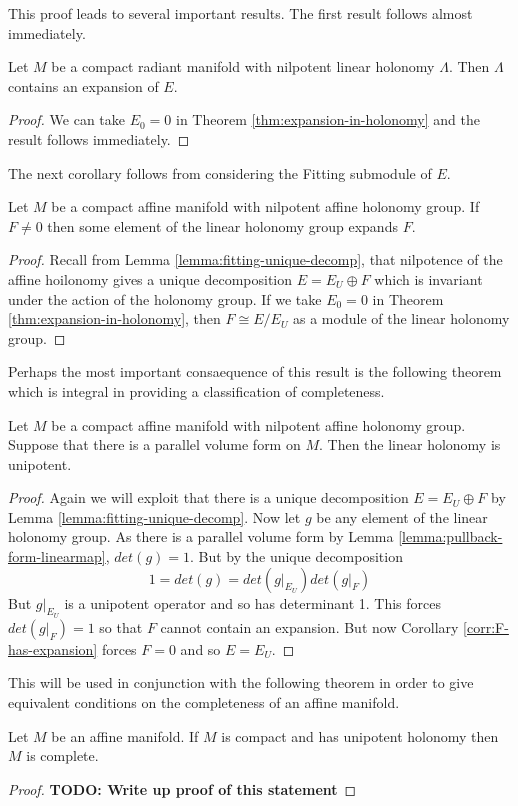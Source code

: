 This proof leads to several important results. The first result follows almost
immediately.

\begin{corollary}
    Let $M$ be a compact radiant manifold with nilpotent linear holonomy $\Lambda$. Then $\Lambda$ contains an expansion of $E$.
\end{corollary}
\begin{proof}
    We can take $E_0 = 0$ in Theorem \ref{thm:expansion-in-holonomy} and the result follows immediately.
\end{proof}

The next corollary follows from considering the Fitting submodule of $E$.

\begin{corollary}
    Let $M$ be a compact affine manifold with nilpotent affine holonomy group. If $F \neq 0$ then some element of the linear holonomy group
    expands $F$.
    \label{corr:F-has-expansion}
\end{corollary}
\begin{proof}
    Recall from Lemma \ref{lemma:fitting-unique-decomp}, that nilpotence of the affine hoilonomy gives a unique decomposition
    $E = E_U \oplus F$ which is invariant under the action of the holonomy group. If we take $E_0 = 0$ in Theorem \ref{thm:expansion-in-holonomy},
    then $F \cong E/E_U$ as a module of the linear holonomy group.
\end{proof}

Perhaps the most important consaequence of this result is the following theorem
which is integral in providing a classification of completeness.

\begin{theorem}
    Let $M$ be a compact affine manifold with nilpotent affine holonomy group. Suppose that there is a parallel volume form on $M$.
    Then the linear holonomy is unipotent.
\end{theorem}

\begin{proof}
    Again we will exploit that there is a unique decomposition $E = E_U \oplus F$ by Lemma \ref{lemma:fitting-unique-decomp}. Now let $g$ be
    any element of the linear holonomy group. As there is a parallel volume form by Lemma \ref{lemma:pullback-form-linearmap}, $det(g)=1$. But by the unique decomposition
    \[1 = det(g) = det(g|_{E_U})det(g|_F)\]
    But $g|_{E_U}$ is a unipotent operator and so has determinant 1. This forces
    $det(g|_F)=1$ so that $F$ cannot contain an expansion. But now Corollary
    \ref{corr:F-has-expansion} forces $F=0$ and so $E = E_U$.
\end{proof}

This will be used in conjunction with the following theorem in order to give
equivalent conditions on the completeness of an affine manifold.

\begin{theorem}
    Let $M$ be an affine manifold. If $M$ is compact and has unipotent holonomy then $M$ is complete.
\end{theorem}

\begin{proof}
    \textbf{TODO: Write up proof of this statement}
\end{proof}